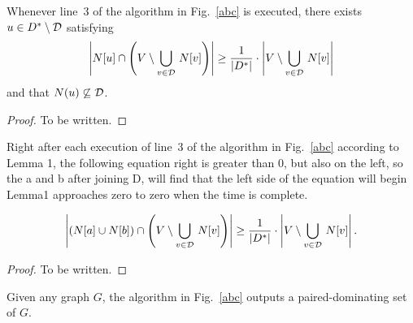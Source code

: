 \documentclass[12pt]{article}
\begin{document}
\begin{lemma}
Whenever line~3 of the algorithm in Fig.~\ref{abc} is executed,
there exists $u\in D^*\setminus {\cal D}$ satisfying
$$
\left|N[u]\cap \left(V\setminus \bigcup_{v\in {\cal D}}\,N[v]\right)\right|
\ge \frac{1}{|D^*|}
\cdot\left|V\setminus \bigcup_{v\in {\cal D}}\,N[v]\right|
$$
and that $N(u)\not\subseteq {\cal D}$.
\end{lemma}
\begin{proof}
To be written.
\end{proof}

\begin{lemma}
Right after each execution of line~3 of the algorithm in Fig.~\ref{abc} according to Lemma 1, the following equation right is greater than 0, but also on the left, so the a and b after joining D, will find that the left side of the equation will begin Lemma1 approaches zero to zero when the time is complete.

$$
\left|\left(N[a]\cup N[b]\right)\cap \left(V\setminus \bigcup_{v\in {\cal D}}\,N[v]\right)\right|
\ge \frac{1}{|D^*|}
\cdot\left|V\setminus \bigcup_{v\in {\cal D}}\,N[v]\right|.
$$
\end{lemma}
\begin{proof}
To be written.
\end{proof}

\begin{lemma}
Given any graph $G$, the algorithm in Fig.~\ref{abc} outputs a paired-dominating set of $G$.
\end{lemma}



\end{document}
